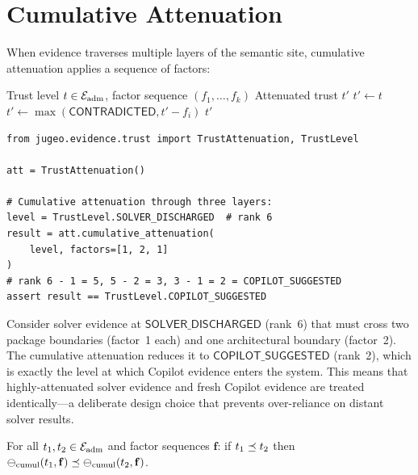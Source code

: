 \documentclass[11pt]{article}
\newcommand{\CopSugg}{\mathsf{COPILOT\_SUGGESTED}}
\newcommand{\SolDis}{\mathsf{SOLVER\_DISCHARGED}}
\newcommand{\Contra}{\mathsf{CONTRADICTED}}
\begin{document}
\section{Cumulative Attenuation}\label{sec:cumulative}

When evidence traverses multiple layers of the semantic site, cumulative
attenuation applies a sequence of factors:

\begin{algorithm}[h]
\caption{Cumulative Attenuation Through Site Layers}
\label{alg:cumulative}
\begin{algorithmic}[1]
\REQUIRE Trust level $t \in \mathcal{E}_{\mathrm{adm}}$, factor sequence $(f_1, \ldots, f_k)$
\ENSURE Attenuated trust $t'$
\STATE $t' \gets t$
  \STATE $t' \gets \max(\Contra, t' - f_i)$
\ENDFOR
\RETURN $t'$
\end{algorithmic}
\end{algorithm}

\begin{lstlisting}[style=jugeo-python]
from jugeo.evidence.trust import TrustAttenuation, TrustLevel

att = TrustAttenuation()

# Cumulative attenuation through three layers:
level = TrustLevel.SOLVER_DISCHARGED  # rank 6
result = att.cumulative_attenuation(
    level, factors=[1, 2, 1]
)
# rank 6 - 1 = 5, 5 - 2 = 3, 3 - 1 = 2 = COPILOT_SUGGESTED
assert result == TrustLevel.COPILOT_SUGGESTED
\end{lstlisting}

\begin{example}\label{ex:cross-pkg}
Consider solver evidence at $\SolDis$ (rank~6) that must cross two package
boundaries (factor~1 each) and one architectural boundary (factor~2).  The
cumulative attenuation reduces it to $\CopSugg$ (rank~2), which is exactly
the level at which Copilot evidence enters the system.  This means that
highly-attenuated solver evidence and fresh Copilot evidence are treated
identically---a deliberate design choice that prevents over-reliance on
distant solver results.
\end{example}

\begin{proposition}\label{prop:atten-mono}
For all $t_1, t_2 \in \mathcal{E}_{\mathrm{adm}}$ and factor sequences $\mathbf{f}$:
if $t_1 \preceq t_2$ then
$\ominus_{\mathrm{cumul}}(t_1, \mathbf{f}) \preceq
 \ominus_{\mathrm{cumul}}(t_2, \mathbf{f})$.
\end{proposition}
\end{document}
